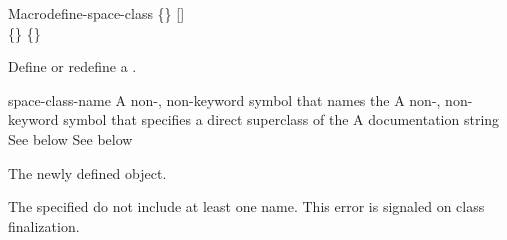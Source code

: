\documentclass[10pt,twoside,english,pdftex]{article}
\begin{document}

\begin{functiondoc}{Macro}{define-space-class}%
   { 
   \code{(}\{\}\superstar\code{)}
   [] \\
   \code{(}\{\}\superstar\code{)}
   \{\}\superstar{} \returns{}
   }
%
%
%

\fnsyntax

\fnpurpose Define or redefine a .

\fnpackage {}

\fnmodule {}

\fnargs
\begin{args}{space-class-name}
 A non-\nil, non-keyword symbol that names the
 A non-\nil, non-keyword symbol that specifies a
direct superclass of the    
\arg[documentation] A documentation string
 See below
 See below
\end{args}

\fnreturns The newly defined  object.

\fnerrors The specified  do not include at least
one  name.  This error is signaled on class finalization.


\end{functiondoc}
\end{document}
